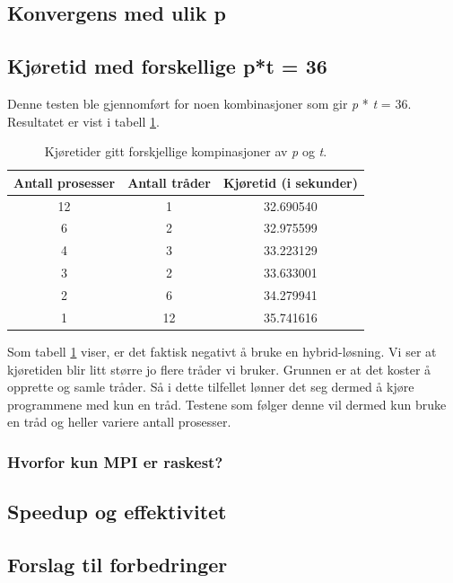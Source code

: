 \documentclass{article}
\begin{document}
\subsection{Konvergens med ulik p}

\subsection{Kjøretid med forskellige p*t = 36}
Denne testen ble gjennomført for noen kombinasjoner som gir \emph{p} * \emph{t} = 36. Resultatet er vist i tabell \ref{p/t-table}.

\begin{table}
\begin{center}
	
	\begin{tabular}{c | c | c}
	\hline \hline 
	Antall prosesser      &    Antall tråder     &    Kjøretid (i sekunder) 	    \\ \hline	
	12		      &		1	     &	  32.690540       		    \\ \hline
	6		      &         2	     &    32.975599       		    \\ \hline
	4		      &         3	     &    33.223129	    		    \\ \hline
	3   		      &		2	     &    33.633001	    		    \\ \hline
	2		      &         6	     &    34.279941	    		    \\ \hline
	1		      &		12	     &    35.741616	    		    \\ \hline
	
	\end{tabular}
\end{center}
\caption{Kjøretider gitt forskjellige kompinasjoner av \emph{p} og \emph{t}.}
\label{p/t-table}
\end{table}

Som tabell \ref{p/t-table} viser, er det faktisk negativt å bruke en hybrid-løsning. Vi ser at kjøretiden blir litt større jo flere tråder vi bruker. Grunnen er at det koster å opprette og samle tråder. Så i dette tilfellet lønner det seg dermed å kjøre programmene med kun en tråd. 
Testene som følger denne vil dermed kun bruke en tråd og heller variere antall prosesser. 

\subsubsection{Hvorfor kun MPI er raskest?}

\subsection{Speedup og effektivitet}


\subsection{Forslag til forbedringer}
\end{document}
